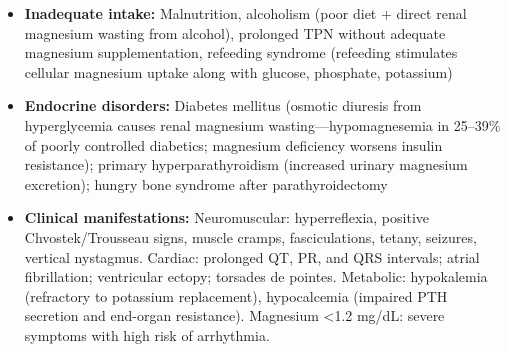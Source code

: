 \begin{itemize}
  \item \textbf{Inadequate intake:} Malnutrition, alcoholism (poor diet + direct renal magnesium wasting from alcohol), prolonged TPN without adequate magnesium supplementation, refeeding syndrome (refeeding stimulates cellular magnesium uptake along with glucose, phosphate, potassium)
  \item \textbf{Endocrine disorders:} Diabetes mellitus (osmotic diuresis from hyperglycemia causes renal magnesium wasting---hypomagnesemia in 25--39\% of poorly controlled diabetics; magnesium deficiency worsens insulin resistance); primary hyperparathyroidism (increased urinary magnesium excretion); hungry bone syndrome after parathyroidectomy
  \item \textbf{Clinical manifestations:} Neuromuscular: hyperreflexia, positive Chvostek/Trousseau signs, muscle cramps, fasciculations, tetany, seizures, vertical nystagmus. Cardiac: prolonged QT, PR, and QRS intervals; atrial fibrillation; ventricular ectopy; torsades de pointes. Metabolic: hypokalemia (refractory to potassium replacement), hypocalcemia (impaired PTH secretion and end-organ resistance). Magnesium <1.2 mg/dL: severe symptoms with high risk of arrhythmia.
\end{itemize}

